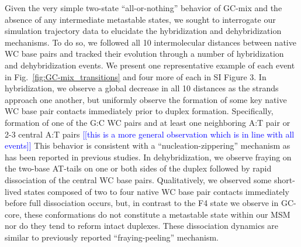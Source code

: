 \documentclass[journal=jpcbfk,manuscript=article]{achemso}
\newcommand*{\noteb}[1]{\textcolor{blue}{[[#1]]}}		%
\begin{document}

Given the very simple two-state ``all-or-nothing'' behavior of GC-mix and the absence of any intermediate metastable states, we sought to interrogate our simulation trajectory data to elucidate the hybridization and dehybridization mechanisms. To do so, we followed all 10 intermolecular distances between native WC base pairs and tracked their evolution through a number of hybridization and dehybridization events. We present one representative example of each event in Fig.~\ref{fig:GC-mix_transitions} and four more of each in SI Figure 3. In hybridization, we observe a global decrease in all 10 distances as the strands approach one another, but uniformly observe the formation of some key native WC base pair contacts immediately prior to duplex formation. Specifically, formation of one of the G:C WC pairs and at least one neighboring A:T pair or 2-3 central A:T pairs \noteb{this is a more general observation which is in line with all events} This behavior is consistent with a ``nucleation-zippering'' mechanism as has been reported in previous studies.\citep{Wetmur1968KineticsDNA, Porschke1971CooperativeTransition, Sambriski2009SequencePathways,  Yin2011KineticsHybridization} In dehybridization, we observe fraying on the two-base AT-tails on one or both sides of the duplex followed by rapid dissociation of the central WC base pairs. Qualitatively, we observed some short-lived states composed of two to four native WC base pair contacts immediately before full dissociation occurs, but, in contrast to the F4 state we observe in GC-core, these conformations do not constitute a metastable state within our MSM nor do they tend to reform intact duplexes. These dissociation dynamics are similar to previously reported ``fraying-peeling'' mechanism.\citep{Wong2008TheSimulations, Perez2010Real-timeUnfolding, Zgarbova2014BaseRNA} 
\end{document}
